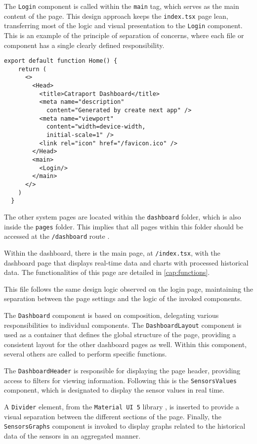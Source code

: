 The \texttt{Login} component is called within the \texttt{main} tag, which serves as the main content of the page. This design approach keeps the \texttt{index.tsx} page lean, transferring most of the logic and visual presentation to the \texttt{Login} component. This is an example of the principle of separation of concerns, where each file or component has a single clearly defined responsibility.

\begin{verbatim}
export default function Home() {
    return (
      <>
        <Head>
          <title>Catraport Dashboard</title>
          <meta name="description" 
            content="Generated by create next app" />
          <meta name="viewport" 
            content="width=device-width,
            initial-scale=1" />
          <link rel="icon" href="/favicon.ico" />
        </Head>
        <main>
          <Login/>
        </main>
      </>
    )
  }
\end{verbatim}

The other system pages are located within the \texttt{dashboard} folder, which is also inside the \texttt{pages} folder. This implies that all pages within this folder should be accessed at the \texttt{/dashboard} route \cite{nextjsDefiningRoutes}.

Within the dashboard, there is the main page, at \texttt{/index.tsx}, with the dashboard page that displays real-time data and charts with processed historical data. The functionalities of this page are detailed in \ref{cap:functions}.

This file follows the same design logic observed on the login page, maintaining the separation between the page settings and the logic of the invoked components.

The \texttt{Dashboard} component is based on composition, delegating various responsibilities to individual components. The \texttt{DashboardLayout} component is used as a container that defines the global structure of the page, providing a consistent layout for the other dashboard pages as well. Within this component, several others are called to perform specific functions.

The \texttt{DashboardHeader} is responsible for displaying the page header, providing access to filters for viewing information. Following this is the \texttt{SensorsValues} component, which is designated to display the sensor values in real time.

A \texttt{Divider} element, from the \texttt{Material UI 5} library \cite{muiDocs}, is inserted to provide a visual separation between the different sections of the page. Finally, the \texttt{SensorsGraphs} component is invoked to display graphs related to the historical data of the sensors in an aggregated manner.

